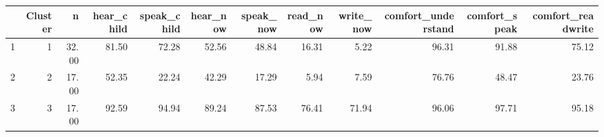 \begin{table}[ht]
\centering
\begin{tabular}{rrrrrrrrrrrr}
  \hline
 & Cluster & n & hear\_child & speak\_child & hear\_now & speak\_now & read\_now & write\_now & comfort\_understand & comfort\_speak & comfort\_readwrite \\ 
  \hline
1 &   1 & 32.00 & 81.50 & 72.28 & 52.56 & 48.84 & 16.31 & 5.22 & 96.31 & 91.88 & 75.12 \\ 
  2 &   2 & 17.00 & 52.35 & 22.24 & 42.29 & 17.29 & 5.94 & 7.59 & 76.76 & 48.47 & 23.76 \\ 
  3 &   3 & 17.00 & 92.59 & 94.94 & 89.24 & 87.53 & 76.41 & 71.94 & 96.06 & 97.71 & 95.18 \\ 
   \hline
\end{tabular}
\end{table}
